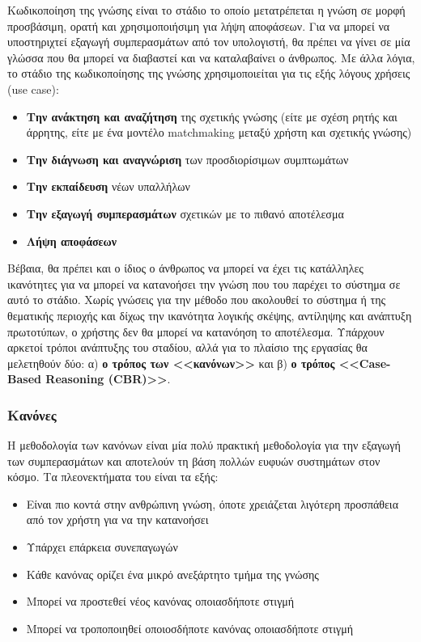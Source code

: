 Κωδικοποίηση της γνώσης είναι το στάδιο το οποίο μετατρέπεται η γνώση σε μορφή προσβάσιμη, ορατή και χρησιμοποιήσιμη για λήψη αποφάσεων. Για να μπορεί να υποστηριχτεί εξαγωγή συμπερασμάτων από τον υπολογιστή, θα πρέπει να γίνει σε μία γλώσσα που θα μπορεί να διαβαστεί και να καταλαβαίνει ο άνθρωπος. Με άλλα λόγια, το στάδιο της κωδικοποίησης της γνώσης χρησιμοποιείται για τις εξής λόγους χρήσεις (use case):

\begin{itemize}
  \item \textbf{Την ανάκτηση και αναζήτηση} της σχετικής γνώσης (είτε με σχέση ρητής και άρρητης, είτε με ένα μοντέλο matchmaking μεταξύ χρήστη και σχετικής γνώσης)
  \item \textbf{Την διάγνωση και αναγνώριση} των προσδιορίσιμων συμπτωμάτων
  \item \textbf{Την εκπαίδευση} νέων υπαλλήλων
  \item \textbf{Την εξαγωγή συμπερασμάτων} σχετικών με το πιθανό αποτέλεσμα
  \item \textbf{Λήψη αποφάσεων}
\end{itemize}

Βέβαια, θα πρέπει και ο ίδιος ο άνθρωπος να μπορεί να έχει τις κατάλληλες ικανότητες για να μπορεί να κατανοήσει την γνώση που του παρέχει το σύστημα σε αυτό το στάδιο. Χωρίς γνώσεις για την μέθοδο που ακολουθεί το σύστημα ή της θεματικής περιοχής και δίχως την ικανότητα λογικής σκέψης, αντίληψης και ανάπτυξη πρωτοτύπων, ο χρήστης δεν θα μπορεί να κατανόηση το αποτέλεσμα. Υπάρχουν αρκετοί τρόποι ανάπτυξης του σταδίου, αλλά για το πλαίσιο της εργασίας θα μελετηθούν δύο: α) \textbf{ο τρόπος των <<κανόνων>>} και β) \textbf{ο τρόπος <<Case-Based Reasoning (CBR)>>}.

\subsubsection*{Κανόνες}

Η μεθοδολογία των κανόνων είναι μία πολύ πρακτική μεθοδολογία για την εξαγωγή των συμπερασμάτων και αποτελούν τη βάση πολλών ευφυών συστημάτων στον κόσμο. Τα πλεονεκτήματα του είναι τα εξής:

\begin{itemize}
  \item Είναι πιο κοντά στην ανθρώπινη γνώση, όποτε χρειάζεται λιγότερη προσπάθεια από τον χρήστη για να την κατανοήσει
  \item Υπάρχει επάρκεια συνεπαγωγών
  \item Κάθε κανόνας ορίζει ένα μικρό ανεξάρτητο τμήμα της γνώσης
  \item Μπορεί να προστεθεί νέος κανόνας οποιασδήποτε στιγμή
  \item Μπορεί να τροποποιηθεί οποιοσδήποτε κανόνας οποιασδήποτε στιγμή
\end{itemize}


